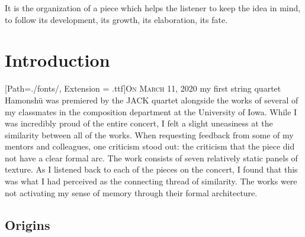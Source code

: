 \pagestyle{fancy}
\renewcommand{\chaptermark}[1]{\markboth{\MakeUppercase{#1}}{}}
\renewcommand{\headrulewidth}{0.4pt}
\begin{savequote}[75mm]
It is the organization of a piece which helps the listener to keep the idea in mind, to follow its development, its growth, its elaboration, its fate.
\end{savequote}

\chapter{Introduction}
\label{introduction}


\lettrine[lines=3]{\setmainfont{GoudyInitialen}[Path=./fonts/, Extension = .ttf]\color{printGreen}O}{n March 11, 2020} my first string quartet Hamonshū was premiered by the JACK quartet alongside the works of several of my classmates in the composition department at the University of Iowa. While I was incredibly proud of the entire concert, I felt a slight uneasiness at the similarity between all of the works. When requesting feedback from some of my mentors and colleagues, one criticism stood out: the criticism that the piece did not have a clear formal arc. The work consists of seven relatively static panels of texture. As I listened back to each of the pieces on the concert, I found that this was what I had perceived as the connecting thread of similarity. The works were not activating my sense of memory through their formal architecture.


\section{Origins}

